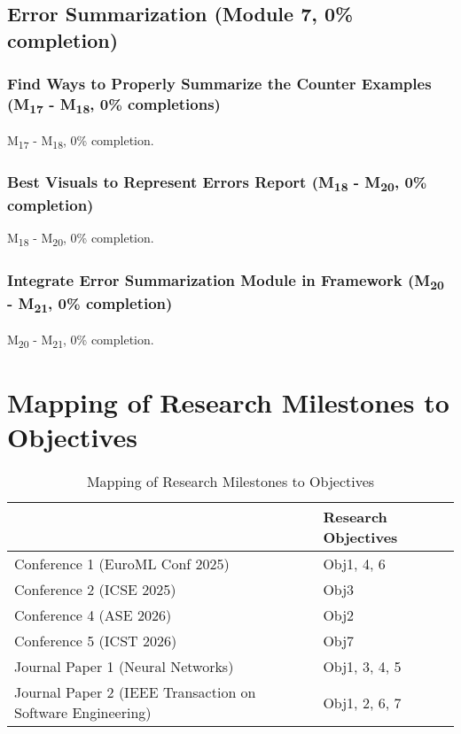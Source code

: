 \subsection{Error Summarization (Module 7, 0\% completion)}
\subsubsection{Find Ways to Properly Summarize the Counter Examples (M\textsubscript{17} - M\textsubscript{18}, 0\% completions)}
M\textsubscript{17} - M\textsubscript{18}, 0\% completion.

\subsubsection{Best Visuals to Represent Errors Report (M\textsubscript{18} - M\textsubscript{20}, 0\% completion)} 
M\textsubscript{18} - M\textsubscript{20}, 0\% completion.

\subsubsection{Integrate Error Summarization Module in Framework (M\textsubscript{20} - M\textsubscript{21}, 0\% completion)}
M\textsubscript{20} - M\textsubscript{21}, 0\% completion.

\section{Mapping of Research Milestones to Objectives}
\begin{table*}[ht]
  \centering
  \renewcommand{\arraystretch}{1.5} 
  \begin{tabular}{|l|l|}
    \hline
    \rowcolor[HTML]{000000} 
    \multicolumn{1}{|c|}{\cellcolor[HTML]{000000}{\color[HTML]{FFFFFF} \textbf{Milestones}}} & {\color[HTML]{FFFFFF} \textbf{Research Objectives}} \\ \hline
    {\color[HTML]{404040} Conference 1 (EuroML Conf 2025)} & Obj1, 4, 6 \\ \hline
    {\color[HTML]{404040} Conference 2 (ICSE 2025)} & Obj3 \\ \hline
    {\color[HTML]{404040} Conference 4 (ASE 2026)} & Obj2 \\ \hline
    {\color[HTML]{404040} Conference 5 (ICST 2026)} & Obj7 \\ \hline
    {\color[HTML]{404040} Journal Paper 1 (Neural Networks)} & Obj1, 3, 4, 5 \\ \hline
    {\color[HTML]{404040} Journal Paper 2 (IEEE Transaction on Software Engineering)} & Obj1, 2, 6, 7 \\ \hline
  \end{tabular}
  \caption{Mapping of Research Milestones to Objectives}
  \label{table:milestones}
\end{table*}


